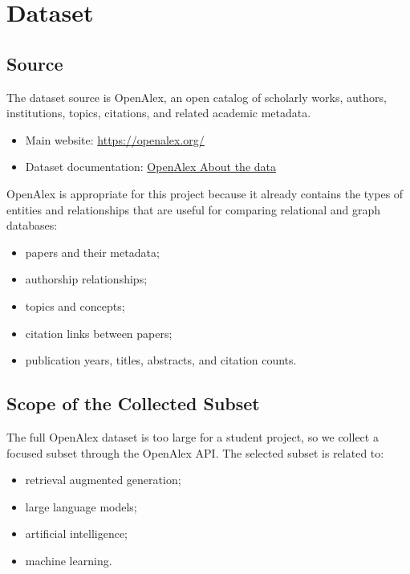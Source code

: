 \documentclass[11pt]{article}
\begin{document}
\section{Dataset}

\subsection{Source}

The dataset source is OpenAlex, an open catalog of scholarly works, authors, institutions, topics, citations, and related academic metadata.

\begin{itemize}
    \item Main website: \url{https://openalex.org/}
    \item Dataset documentation: \href{https://help.openalex.org/hc/en-us/articles/24397285563671-About-the-data}{OpenAlex About the data}
\end{itemize}

OpenAlex is appropriate for this project because it already contains the types of entities and relationships that are useful for comparing relational and graph databases:

\begin{itemize}
    \item papers and their metadata;
    \item authorship relationships;
    \item topics and concepts;
    \item citation links between papers;
    \item publication years, titles, abstracts, and citation counts.
\end{itemize}

\subsection{Scope of the Collected Subset}

The full OpenAlex dataset is too large for a student project, so we collect a focused subset through the OpenAlex API.
The selected subset is related to:

\begin{itemize}
    \item retrieval augmented generation;
    \item large language models;
    \item artificial intelligence;
    \item machine learning.
\end{itemize}
\end{document}
